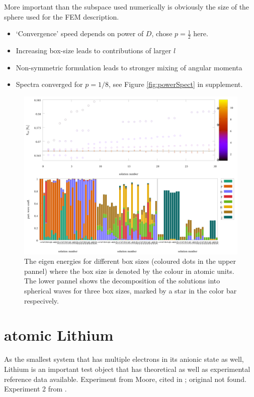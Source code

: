 More important than the subspace used numerically is obviously the size of the sphere used for the FEM description.
\begin{itemize}
   \item `Convergence' speed depends on power of $D$, chose $p=\frac 12$ here.
   \item Increasing box-size leads to contributions of larger $l$ 
   \item Non-symmetric formulation leads to stronger mixing of angular momenta
   \item Spectra converged for $p=1/8$, see Figure \ref{fig:powerSpect} in supplement.
\end{itemize}
\begin{figure}
\includegraphics[width=\textwidth]{Figures/RadWaves_p0_5.pdf}
\caption{The eigen energies for different box sizes (coloured dots in the upper pannel) where the box size is denoted by the colour in atomic units.
The lower pannel shows the decomposition of the solutions into spherical waves for three box sizes, marked by a star in the color bar respecively.}
\label{fig:RadWaves}
\end{figure}

\section{atomic Lithium}
\label{ch:resLI}
As the smallest system that has multiple electrons in its anionic state as well, Lithium is an important
test object that has theoretical as well as experimental reference data available\cite{Li-R,Li-R1, LiNaRef1}.
Experiment from Moore, cited in \cite{LiNaRef1}; original not found.
Experiment 2 from \cite{LiSonntag}.

